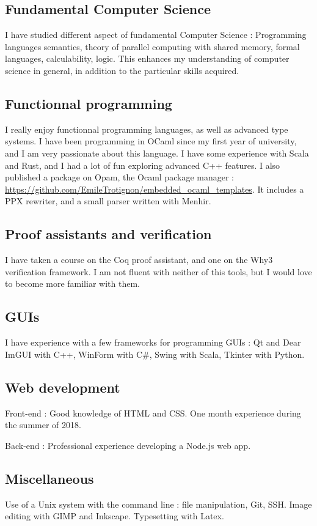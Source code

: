 \documentclass[10pt, a4paper, roman, french]{moderncv}
\begin{document}
		\subsection{Fundamental Computer Science}
			I have studied different aspect of fundamental Computer Science :
Programming languages semantics, theory of parallel computing with shared memory, formal languages, calculability, logic.
This enhances my understanding of computer science in general, in addition to the particular skills acquired.
	
		\subsection{Functionnal programming}
			 I really enjoy functionnal programming languages, as well as advanced type systems. I have been programming in OCaml since my first year of university, and I am very passionate about this language. I have some experience with Scala and Rust, and I had a lot of fun exploring advanced C++ features.
I also published a package on Opam, the Ocaml package manager : \url{https://github.com/EmileTrotignon/embedded_ocaml_templates}.
It includes a PPX rewriter, and a small parser written with Menhir.
	
		\subsection{Proof assistants and verification}
			I have taken a course on the Coq proof assistant, and one on the Why3 verification framework. I am not fluent with neither of this tools, but I would love to become more familiar with them.
	
		\subsection{GUIs}
			I have experience with a few frameworks for programming GUIs :
Qt and Dear ImGUI with C++, WinForm with C\#, Swing with Scala, Tkinter with Python.
	
		\subsection{Web development}
			Front-end : Good knowledge of HTML and CSS. One month experience during the summer of 2018.

Back-end : Professional experience developing a Node.js web app.
	
		\subsection{Miscellaneous}
			Use of a Unix system with the command line : file manipulation, Git, SSH.
Image editing with GIMP and Inkscape.
Typesetting with Latex.
	
\end{document}
